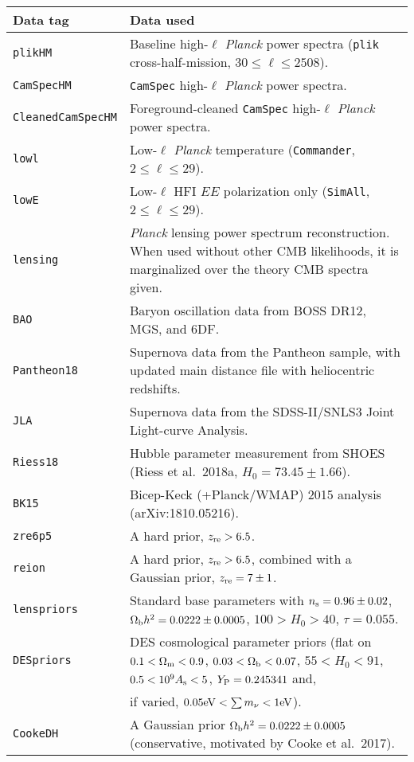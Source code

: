 \begin{tabular} { l   l  }
Data tag & Data used\\
\hline
{\tt plikHM}         & Baseline high-$\ell$ \textit{Planck} power spectra ({\tt plik} cross-half-mission, $30\le \ell\le 2508$). \\
{\tt CamSpecHM}      & {\tt CamSpec} high-$\ell$ \textit{Planck} power spectra. \\
{\tt CleanedCamSpecHM}   & Foreground-cleaned {\tt CamSpec} high-$\ell$ \textit{Planck} power spectra. \\
{\tt lowl }          & Low-$\ell$ \textit{Planck} temperature ({\tt Commander}, $2\le \ell \le 29$). \\
{\tt lowE}           & Low-$\ell$  HFI $EE$ polarization only ({\tt SimAll}, $2\le \ell \le 29$). \\
{\tt lensing}        & \textit{Planck} lensing power spectrum reconstruction. When used without other CMB likelihoods, it is marginalized over the theory CMB spectra given. \\
{\tt BAO}            & Baryon oscillation data from BOSS DR12, MGS, and 6DF. \\
{\tt Pantheon18}     & Supernova data from the Pantheon sample, with updated main distance file with heliocentric redshifts. \\
{\tt JLA}            & Supernova data from the SDSS-II/SNLS3 Joint Light-curve Analysis. \\
{\tt Riess18}        & Hubble parameter measurement from SHOES (Riess et al.\ 2018a, $H_0=73.45\pm 1.66$). \\
{\tt BK15}           & Bicep-Keck (+Planck/WMAP) 2015 analysis (arXiv:1810.05216). \\
{\tt zre6p5}         & A hard prior, $z_{\rm re} > 6.5$. \\
{\tt reion}          & A hard prior, $z_{\rm re} > 6.5$, combined with a Gaussian prior, $z_{\rm re} = 7\pm 1$. \\
{\tt lenspriors}     & Standard base parameters with $n_{\rm s} = 0.96\pm 0.02$, $\Omega_{\rm b}h^2 =  0.0222\pm 0.0005$, $100>H_0>40$, $\tau=0.055$. \\
{\tt DESpriors}      & DES cosmological parameter priors (flat on $0.1<\Omega_{\rm m}<0.9$, $0.03<\Omega_{\rm b}<0.07$, $55<H_0<91$, $0.5<10^9A_{\rm s}<5$, $Y_{\rm P}=0.245341$ and, \\
                     & if varied, $0.05{\rm eV}<\sum m_\nu<1{\rm eV}$). \\
{\tt CookeDH}        & A Gaussian prior $\Omega_{\rm b}h^2 =  0.0222\pm 0.0005$ (conservative, motivated by Cooke et al.\ 2017). \\

\end{tabular}
